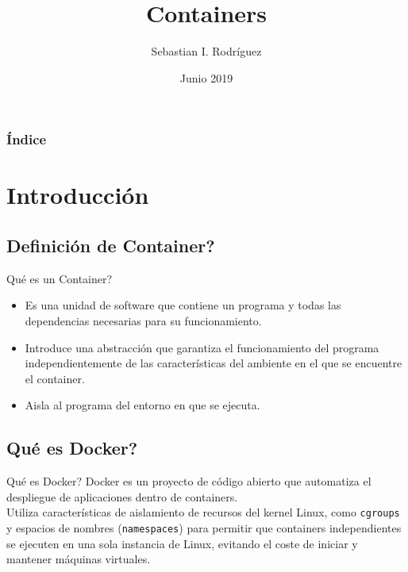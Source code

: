\documentclass{beamer}
\title{Containers}
\author[S. I. Rodríguez]{Sebastian I. Rodríguez}
\institute
{
  Instituto Politécnico Superior Gral. San Martín
}
\date{Junio 2019}
\begin{document}
\begin{frame}
  \titlepage
\end{frame}

\begin{frame}
  \frametitle{Índice}
  \tableofcontents
\end{frame}

\section{Introducción}

\subsection{Definición de Container?}

\begin{frame}{Qué es un Container?}

  \begin{itemize}
  \item
    Es una unidad de software que contiene un programa y todas las dependencias necesarias para su funcionamiento.
  \item
   Introduce una abstracción que garantiza el funcionamiento del programa independientemente de las características del ambiente en el que se encuentre el container.
  \item 
  Aisla al programa del entorno en que se ejecuta.
  \end{itemize}
\end{frame}

\subsection{Qué es Docker?}

\begin{frame}{Qué es Docker?}
	\hspace{1cm} Docker es un proyecto de código abierto que automatiza el despliegue de aplicaciones dentro de containers. \\
	\vspace{0.5cm}
	\hspace{1cm} Utiliza características de aislamiento de recursos del kernel Linux, como \texttt{cgroups} y espacios de nombres (\texttt{namespaces}) para permitir que containers independientes se ejecuten en una sola instancia de Linux, evitando el coste de iniciar y mantener máquinas virtuales.
\end{frame}
\end{document}
